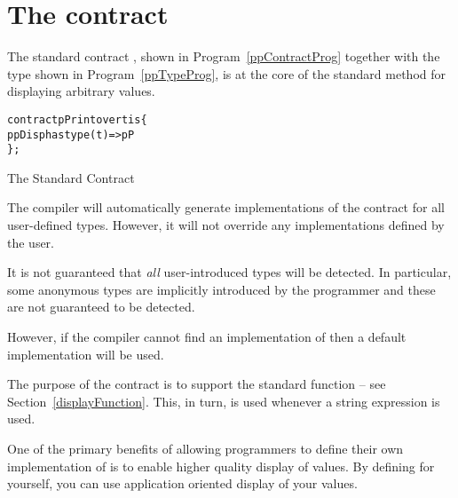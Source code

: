 \section{The  contract}
\label{pPrintContract}

The standard contract , shown in Program~\vref{ppContractProg} together with the  type shown in Program~\vref{ppTypeProg}, is at the core of the standard method for displaying arbitrary values. 
\begin{program}
\begin{alltt}
contract pPrint over t is \{
  ppDisp has type (t)=>pP
\};
\end{alltt}
\caption{The Standard  Contract}\label{ppContractProg}
\end{program}
The \Sr compiler will automatically generate implementations of the  contract for all user-defined types. However, it will not override any implementations defined by the user.
\begin{aside}
It is not guaranteed that \emph{all} user-introduced types will be detected. In particular, some anonymous types are implicitly introduced by the programmer and these are not guaranteed to be detected.

However, if the compiler cannot find an implementation of  then a default implementation will be used.
\end{aside}

The purpose of the  contract is to support the standard  function -- see Section~\vref{displayFunction}. This, in turn, is used whenever a string  expression is used.

\begin{aside}
One of the primary benefits of allowing programmers to define their own implementation of  is to enable higher quality display of values. By defining  for yourself, you can use application oriented display of your values.
\end{aside}



